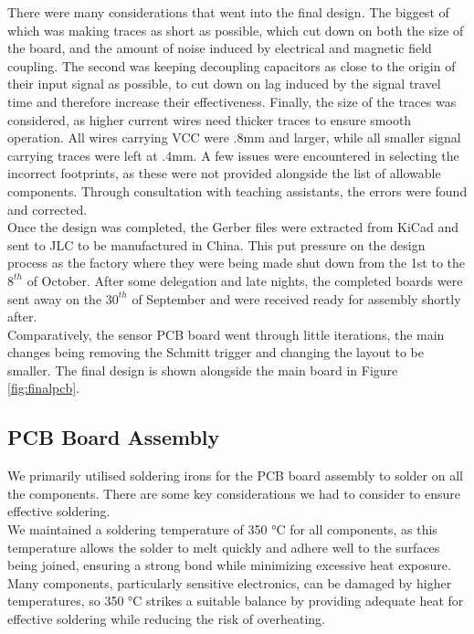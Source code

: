 \documentclass{article}
\begin{document}
There were many considerations that went into the final design. The biggest of which was making traces as short as possible, which cut down on both the size of the board, and the amount of noise induced by electrical and magnetic field coupling. The second was keeping decoupling capacitors as close to the origin of their input signal as possible, to cut down on lag induced by the signal travel time and therefore increase their effectiveness. Finally, the size of the traces was considered, as higher current wires need thicker traces to ensure smooth operation. All wires carrying VCC were .8mm and larger, while all smaller signal carrying traces were left at .4mm. A few issues were encountered in selecting the incorrect footprints, as these were not provided alongside the list of allowable components. Through consultation with teaching assistants, the errors were found and corrected. 
\\

Once the design was completed, the Gerber files were extracted from KiCad and sent to JLC to be manufactured in China. This put pressure on the design process as the factory where they were being made shut down from the 1st to the $8^{th}$ of October. After some delegation and late nights, the completed boards were sent away on the $30^{th}$ of September and were received ready for assembly shortly after. 
\\

Comparatively, the sensor PCB board went through little iterations, the main changes being removing the Schmitt trigger and changing the layout to be smaller. The final design is shown alongside the main board in Figure \ref{fig:finalpcb}. 

\subsection{PCB Board Assembly}
We primarily utilised soldering irons for the PCB board assembly to solder on all the components. There are some key considerations we had to consider to ensure effective soldering.  
\\

We maintained a soldering temperature of 350 °C for all components, as this temperature allows the solder to melt quickly and adhere well to the surfaces being joined, ensuring a strong bond while minimizing excessive heat exposure. Many components, particularly sensitive electronics, can be damaged by higher temperatures, so 350 °C strikes a suitable balance by providing adequate heat for effective soldering while reducing the risk of overheating.  
\\
\end{document}
